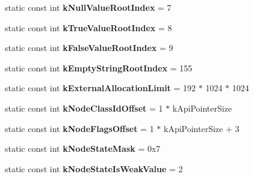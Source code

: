 \begin{DoxyCompactItemize}
\item 
\hypertarget{classv8_1_1internal_1_1_internals_ab311cf753ec5c968052bd83ef21e83f8}{}static const int {\bfseries k\+Null\+Value\+Root\+Index} = 7\label{classv8_1_1internal_1_1_internals_ab311cf753ec5c968052bd83ef21e83f8}

\item 
\hypertarget{classv8_1_1internal_1_1_internals_a93abd58b178eca469bade28e68b5c59e}{}static const int {\bfseries k\+True\+Value\+Root\+Index} = 8\label{classv8_1_1internal_1_1_internals_a93abd58b178eca469bade28e68b5c59e}

\item 
\hypertarget{classv8_1_1internal_1_1_internals_a90b6837aa368bbe4ffd914e6f753b167}{}static const int {\bfseries k\+False\+Value\+Root\+Index} = 9\label{classv8_1_1internal_1_1_internals_a90b6837aa368bbe4ffd914e6f753b167}

\item 
\hypertarget{classv8_1_1internal_1_1_internals_a6f669f3d98fe653b281b26be3bc0655a}{}static const int {\bfseries k\+Empty\+String\+Root\+Index} = 155\label{classv8_1_1internal_1_1_internals_a6f669f3d98fe653b281b26be3bc0655a}

\item 
\hypertarget{classv8_1_1internal_1_1_internals_aa88e5a295f86584aa3e90ebc1a6c4739}{}static const int {\bfseries k\+External\+Allocation\+Limit} = 192 $\ast$ 1024 $\ast$ 1024\label{classv8_1_1internal_1_1_internals_aa88e5a295f86584aa3e90ebc1a6c4739}

\item 
\hypertarget{classv8_1_1internal_1_1_internals_af4fb6d499cb87f03031ad4d6be6bcd8f}{}static const int {\bfseries k\+Node\+Class\+Id\+Offset} = 1 $\ast$ k\+Api\+Pointer\+Size\label{classv8_1_1internal_1_1_internals_af4fb6d499cb87f03031ad4d6be6bcd8f}

\item 
\hypertarget{classv8_1_1internal_1_1_internals_aee5606f2a44d43d8dafe344e0bb753ef}{}static const int {\bfseries k\+Node\+Flags\+Offset} = 1 $\ast$ k\+Api\+Pointer\+Size + 3\label{classv8_1_1internal_1_1_internals_aee5606f2a44d43d8dafe344e0bb753ef}

\item 
\hypertarget{classv8_1_1internal_1_1_internals_a853acc088978d38a5a69091cf857a46d}{}static const int {\bfseries k\+Node\+State\+Mask} = 0x7\label{classv8_1_1internal_1_1_internals_a853acc088978d38a5a69091cf857a46d}

\item 
\hypertarget{classv8_1_1internal_1_1_internals_a8a5d4cc92a6952c2a50922c77a606e68}{}static const int {\bfseries k\+Node\+State\+Is\+Weak\+Value} = 2\label{classv8_1_1internal_1_1_internals_a8a5d4cc92a6952c2a50922c77a606e68}


\end{DoxyCompactItemize}
